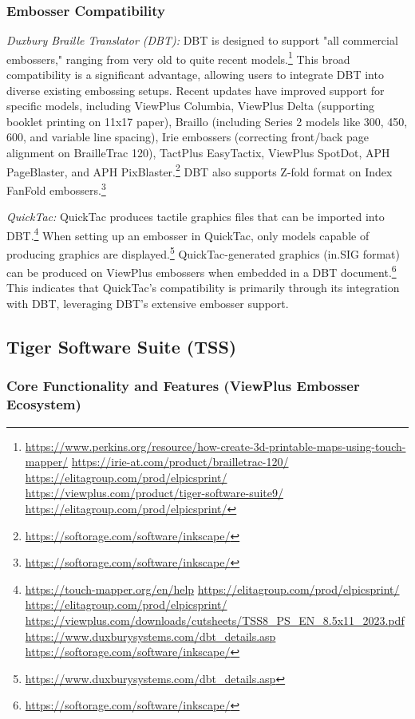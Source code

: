 \subsubsection{Embosser Compatibility}

\emph{Duxbury Braille Translator (DBT):}
DBT is designed to support "all commercial embossers," ranging from very old to quite recent models.\footnote{\url{https://www.perkins.org/resource/how-create-3d-printable-maps-using-touch-mapper/} \url{https://irie-at.com/product/brailletrac-120/} \url{https://elitagroup.com/prod/elpicsprint/} \url{https://viewplus.com/product/tiger-software-suite9/} \url{https://elitagroup.com/prod/elpicsprint/}} This broad compatibility is a significant advantage, allowing users to integrate DBT into diverse existing embossing setups. Recent updates have improved support for specific models, including ViewPlus Columbia, ViewPlus Delta (supporting booklet printing on 11x17 paper), Braillo (including Series 2 models like 300, 450, 600, and variable line spacing), Irie embossers (correcting front/back page alignment on BrailleTrac 120), TactPlus EasyTactix, ViewPlus SpotDot, APH PageBlaster, and APH PixBlaster.\footnote{\url{https://softorage.com/software/inkscape/}} DBT also supports Z-fold format on Index FanFold embossers.\footnote{\url{https://softorage.com/software/inkscape/}}

\emph{QuickTac:}
QuickTac produces tactile graphics files that can be imported into DBT.\footnote{\url{https://touch-mapper.org/en/help} \url{https://elitagroup.com/prod/elpicsprint/} \url{https://elitagroup.com/prod/elpicsprint/} \url{https://viewplus.com/downloads/cutsheets/TSS8_PS_EN_8.5x11_2023.pdf} \url{https://www.duxburysystems.com/dbt_details.asp} \url{https://softorage.com/software/inkscape/}} When setting up an embosser in QuickTac, only models capable of producing graphics are displayed.\footnote{\url{https://www.duxburysystems.com/dbt_details.asp}} QuickTac-generated graphics (in.SIG format) can be produced on ViewPlus embossers when embedded in a DBT document.\footnote{\url{https://softorage.com/software/inkscape/}} This indicates that QuickTac's compatibility is primarily through its integration with DBT, leveraging DBT's extensive embosser support.

\subsection{Tiger Software Suite (TSS)}

\subsubsection{Core Functionality and Features (ViewPlus Embosser Ecosystem)}

